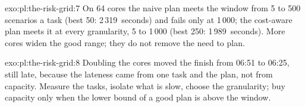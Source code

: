 \begin{solution}{exo:pl:the-risk-grid:7}
On 64 cores the naive plan meets the window from 5 to 500 scenarios a task (best 50: 2\,319~seconds) and fails only at 1\,000; the
cost-aware plan meets it at every granularity, 5 to 1\,000 (best 250: 1\,989~seconds). More cores widen the good range; they do not remove the need to plan.
\end{solution}

\begin{solution}{exo:pl:the-risk-grid:8}
Doubling the cores moved the finish from 06:51 to 06:25, still late, because the lateness came from one task and the plan, not from capacity.
Measure the tasks, isolate what is slow, choose the granularity; buy capacity only when the lower bound of a good plan is above the window.
\end{solution}

